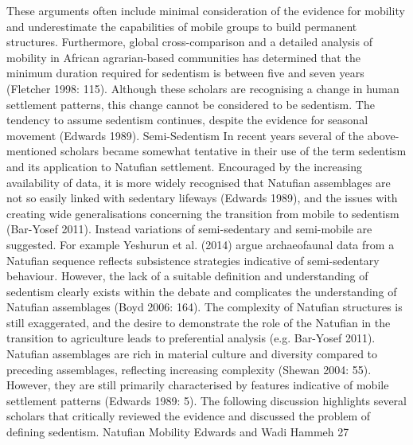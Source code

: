 \documentclass[%
	]{ijsra}
\begin{document}
These arguments often include minimal consideration of the evidence for mobility and underestimate the capabilities of mobile groups to build permanent structures. Furthermore, global cross-comparison and a detailed analysis of mobility in African agrarian-based communities has determined that the minimum duration required for sedentism is between five and seven years (Fletcher 1998: 115). Although these scholars are recognising a change in human settlement patterns, this change cannot be considered to be sedentism. The tendency to assume sedentism continues, despite the evidence for seasonal movement (Edwards 1989).
Semi-Sedentism
In recent years several of the above-mentioned scholars became somewhat tentative in their use of the term sedentism and its application to Natufian settlement. Encouraged by the increasing availability of data, it is more widely recognised that Natufian assemblages are not so easily linked with sedentary lifeways (Edwards 1989), and the issues with creating wide generalisations concerning the transition from mobile to sedentism (Bar-Yosef 2011). Instead variations of semi-sedentary and semi-mobile are suggested. For example Yeshurun et al. (2014) argue archaeofaunal data from a Natufian sequence reflects subsistence strategies indicative of semi-sedentary behaviour. However, the lack of a suitable definition and understanding of sedentism clearly exists within the debate and complicates the understanding of Natufian assemblages (Boyd 2006: 164). The complexity of Natufian structures is still exaggerated, and the desire to demonstrate the role of the Natufian in the transition to agriculture leads to preferential analysis (e.g. Bar-Yosef 2011). Natufian assemblages are rich in material culture and diversity compared to preceding assemblages, reflecting increasing complexity (Shewan 2004: 55). However, they are still primarily characterised by features indicative of mobile settlement patterns (Edwards 1989: 5). The following discussion highlights several scholars that critically reviewed the evidence and discussed the problem of defining sedentism.
Natufian Mobility
Edwards and Wadi Hammeh 27
\end{document}
